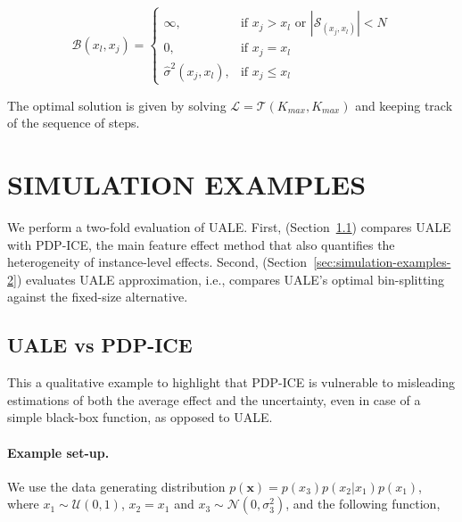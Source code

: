 \documentclass[twoside]{article}
\begin{document}
\begin{equation}
  \label{eq:cost_step}
  \mathcal{B}(x_l, x_j) = \begin{cases}
                            \infty, & \text{if $x_j > x_l$ or \(|\mathcal{S}_{(x_j, x_l)}| < N\)}\\
                            0, & \text{if $x_j = x_l$}\\
                            \hat{\sigma}^2(x_j, x_l), &\text{if $x_j \leq x_l$}
  \end{cases}
\end{equation}

The optimal solution is given by solving
\(\mathcal{L} = \mathcal{T}(K_{max}, K_{max})\) and keeping track of the sequence of
steps. 




\section{SIMULATION EXAMPLES}
\label{sec:simulation-examples}

We perform a two-fold evaluation of UALE. First,
(Section~\ref{sec:simulation-examples-1}) compares UALE with PDP-ICE,
the main feature effect method that also quantifies the heterogeneity
of instance-level effects. Second,
(Section~\ref{sec:simulation-examples-2}) evaluates UALE
approximation, i.e., compares UALE's optimal bin-splitting against the
fixed-size alternative.

\subsection{UALE vs PDP-ICE}
\label{sec:simulation-examples-1}

This a qualitative example to highlight that PDP-ICE is vulnerable to
misleading estimations of both the average effect and the uncertainty,
even in case of a simple black-box function, as opposed to UALE.

\paragraph{Example set-up.}
We use the data generating distribution
\(p(\mathbf{x}) = p(x_3)p(x_2|x_1)p(x_1)\), where
\(x_1 \sim \mathcal{U}(0,1)\), \(x_2 = x_1\) and
\(x_3 \sim \mathcal{N}(0, \sigma_3^2)\), and the following function,
\end{document}
